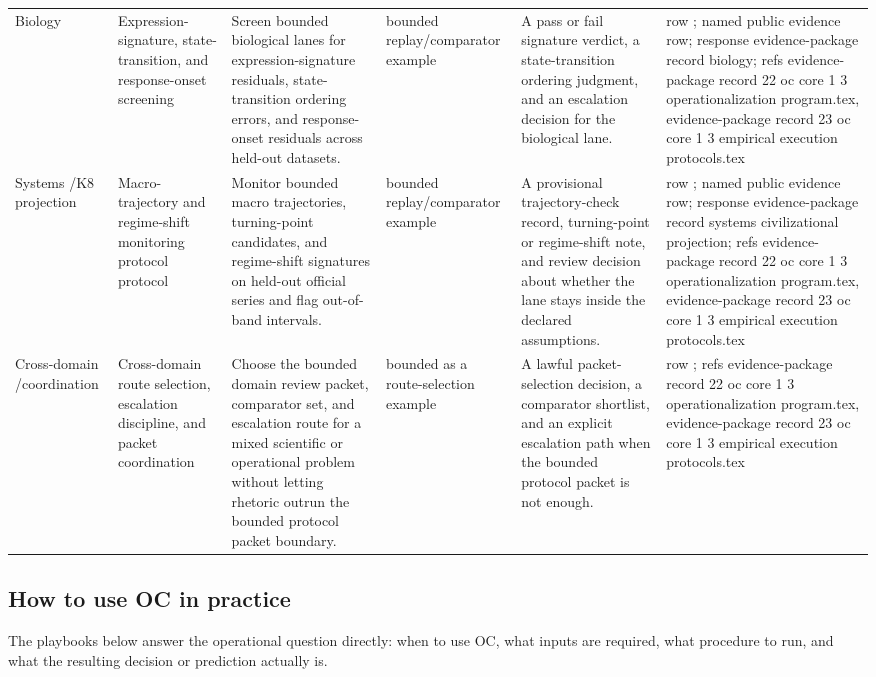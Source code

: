 \begin{longtable}{@{}L{0.11\textwidth}L{0.16\textwidth}L{0.19\textwidth}L{0.12\textwidth}L{0.18\textwidth}L{0.16\textwidth}@{}}
Biology & Expression-signature, state-transition, and response-onset screening & Screen bounded biological lanes for expression-signature residuals, state-transition ordering errors, and response-onset residuals across held-out datasets. & bounded replay/comparator example & A pass or fail signature verdict, a state-transition ordering judgment, and an escalation decision for the biological lane. & row ; named public evidence row; \allowbreak response evidence-package record biology; \allowbreak refs evidence-package record 22 oc core 1 3 operationalization program.tex, \allowbreak evidence-package record 23 oc core 1 3 empirical execution protocols.tex \\
Systems /\allowbreak K8 projection & Macro-trajectory and regime-shift monitoring protocol protocol & Monitor bounded macro trajectories, turning-point candidates, and regime-shift signatures on held-out official series and flag out-of-band intervals. & bounded replay/comparator example & A provisional trajectory-check record, turning-point or regime-shift note, and review decision about whether the lane stays inside the declared assumptions. & row ; named public evidence row; \allowbreak response evidence-package record systems civilizational projection; \allowbreak refs evidence-package record 22 oc core 1 3 operationalization program.tex, \allowbreak evidence-package record 23 oc core 1 3 empirical execution protocols.tex \\
Cross-domain /\allowbreak coordination & Cross-domain route selection, escalation discipline, and packet coordination & Choose the bounded domain review packet, comparator set, and escalation route for a mixed scientific or operational problem without letting rhetoric outrun the bounded protocol packet boundary. & bounded as a route-selection example & A lawful packet-selection decision, a comparator shortlist, and an explicit escalation path when the bounded protocol packet is not enough. & row ; \allowbreak refs evidence-package record 22 oc core 1 3 operationalization program.tex, \allowbreak evidence-package record 23 oc core 1 3 empirical execution protocols.tex \\
\bottomrule
\end{longtable}
\endgroup

\subsection{How to use OC in practice}
The playbooks below answer the operational question directly: when to use OC, what inputs are required, what procedure to run, and what the resulting decision or prediction actually is.

